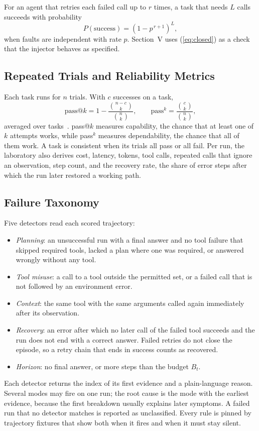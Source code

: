 \documentclass[conference,a4paper]{IEEEtran}
\begin{document}
For an agent that retries each failed call up to $r$ times, a task that needs $L$ calls
succeeds with probability
\begin{equation}
P(\mathrm{success}) = \left(1 - p^{\,r+1}\right)^{L},
\label{eq:closed}
\end{equation}
when faults are independent with rate $p$. Section~V uses (\ref{eq:closed}) as a check
that the injector behaves as specified.

\subsection{Repeated Trials and Reliability Metrics}
Each task runs for $n$ trials. With $c$ successes on a task,
\begin{equation}
\mathrm{pass@}k = 1 - \frac{\binom{n-c}{k}}{\binom{n}{k}}, \qquad
\mathrm{pass}^k = \frac{\binom{c}{k}}{\binom{n}{k}},
\label{eq:passk}
\end{equation}
averaged over tasks~\cite{chen2021codex,yao2024taubench}. pass@$k$ measures capability,
the chance that at least one of $k$ attempts works, while pass$^k$ measures
dependability, the chance that all of them work. A task is consistent when its trials
all pass or all fail. Per run, the laboratory also derives cost, latency, tokens, tool
calls, repeated calls that ignore an observation, step count, and the recovery rate, the
share of error steps after which the run later restored a working path.

\subsection{Failure Taxonomy}
Five detectors read each scored trajectory:
\begin{itemize}
\item \textit{Planning}: an unsuccessful run with a final answer and no tool failure
that skipped required tools, lacked a plan where one was required, or answered wrongly
without any tool.
\item \textit{Tool misuse}: a call to a tool outside the permitted set, or a failed
call that is not followed by an environment error.
\item \textit{Context}: the same tool with the same arguments called again immediately
after its observation.
\item \textit{Recovery}: an error after which no later call of the failed tool succeeds
and the run does not end with a correct answer. Failed retries do not close the
episode, so a retry chain that ends in success counts as recovered.
\item \textit{Horizon}: no final answer, or more steps than the budget $B_t$.
\end{itemize}
Each detector returns the index of its first evidence and a plain-language reason.
Several modes may fire on one run; the root cause is the mode with the earliest
evidence, because the first breakdown usually explains later symptoms. A failed run that
no detector matches is reported as unclassified. Every rule is pinned by trajectory
fixtures that show both when it fires and when it must stay silent.
\end{document}
